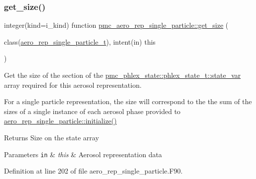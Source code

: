 \subsubsection{\texorpdfstring{get\+\_\+size()}{get\_size()}}
{\footnotesize\ttfamily integer(kind=i\+\_\+kind) function \mbox{\hyperlink{interfacepmc__aero__rep__data_1_1get__size}{pmc\+\_\+aero\+\_\+rep\+\_\+single\+\_\+particle\+::get\+\_\+size}} (\begin{DoxyParamCaption}\item[{class(\mbox{\hyperlink{structpmc__aero__rep__single__particle_1_1aero__rep__single__particle__t}{aero\+\_\+rep\+\_\+single\+\_\+particle\+\_\+t}}), intent(in)}]{this }\end{DoxyParamCaption})\hspace{0.3cm}{\ttfamily [private]}}



Get the size of the section of the {\ttfamily \mbox{\hyperlink{structpmc__phlex__state_1_1phlex__state__t_a78835cb552d483ebbfc7a6bc6f756918}{pmc\+\_\+phlex\+\_\+state\+::phlex\+\_\+state\+\_\+t\+::state\+\_\+var}}} array required for this aerosol representation. 

For a single particle representation, the size will correspond to the the sum of the sizes of a single instance of each aerosol phase provided to {\ttfamily \mbox{\hyperlink{namespacepmc__aero__rep__single__particle_a68b301b8be296690e52b600ecaab5125}{aero\+\_\+rep\+\_\+single\+\_\+particle\+::initialize()}}} 

\begin{DoxyReturn}{Returns}
Size on the state array
\end{DoxyReturn}

\begin{DoxyParams}[1]{Parameters}
\mbox{\tt in}  & {\em this} & Aerosol representation data \\
\hline
\end{DoxyParams}


Definition at line 202 of file aero\+\_\+rep\+\_\+single\+\_\+particle.\+F90.

\mbox{\label{namespacepmc__aero__rep__single__particle_a68b301b8be296690e52b600ecaab5125}} 
